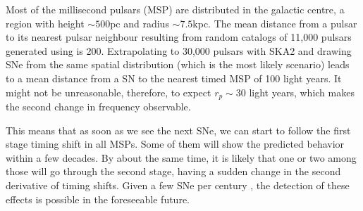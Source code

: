 \documentclass[aps,showpacs,onecolumn,floats,prd,superscriptaddress,nofootinbib]{revtex4}
\begin{document}
Most of the millisecond pulsars (MSP) are distributed in the galactic centre, a region with height $\sim 500$pc and radius $\sim 7.5$kpc. The mean distance from a pulsar to its nearest pulsar neighbour resulting from random catalogs of 11,000 pulsars generated using \cite{MSPpopulation} is 200.  Extrapolating to 30,000 pulsars with SKA2 \cite{SKA} and drawing SNe from the same spatial distribution (which is the most likely scenario) leads to a mean distance from a SN to the nearest timed MSP of 100 light years. It might not be unreasonable, therefore, to expect $r_p \sim30$ light years, which makes the second change in frequency observable. 


This means that as soon as we see the next SNe, we can start to follow the first stage timing shift in all MSPs. Some of them will show the predicted behavior within a few decades. By about the same time, it is likely that one or two among those will go through the second stage, having a sudden change in the second derivative of timing shifts. Given a few SNe per century \cite{SNrate06}, the detection of these effects is possible in the foreseeable future. 

\end{document}
